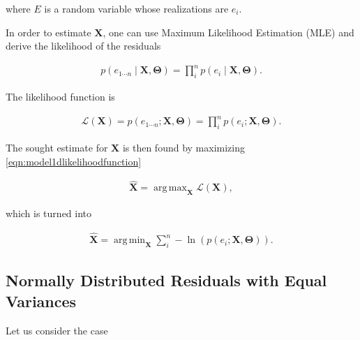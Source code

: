 \documentclass[12pt]{article}
\DeclareMathOperator*{\argmax}{arg\,max}
\DeclareMathOperator*{\argmin}{arg\,min}
\begin{document}
    \noindent where $E$ is a random variable whose realizations are $e_i$.

    In order to estimate $\mathbf{X}$, one can use Maximum Likelihood Estimation
    (MLE) and derive the likelihood of the residuals

    \begin{equation}\label{eqn:model1dlikelihood}
      \begin{aligned}
      p(e_{1\cdots n}\mid\mathbf{X},\boldsymbol{\Theta}) =
        \prod_i^n p(e_i\mid\mathbf{X},\boldsymbol{\Theta}).
      \end{aligned}
    \end{equation}

    The likelihood function is

    \begin{equation}\label{eqn:model1dlikelihoodfunction}
      \begin{aligned}
      \mathcal{L}(\mathbf{X}) = p(e_{1\cdots n};\mathbf{X},\boldsymbol{\Theta}) =
        \prod_i^n p(e_i;\mathbf{X},\boldsymbol{\Theta}).
      \end{aligned}
    \end{equation}


    The sought estimate for $\mathbf{X}$ is then found by maximizing
    \eqref{eqn:model1dlikelihoodfunction}

    \begin{equation}\label{eqn:model1dmaxl}
      \begin{aligned}
      \mathbf{\hat{X}} = \argmax_{\mathbf{X}}\mathcal{L}(\mathbf{X}),
      \end{aligned}
    \end{equation}

    which is turned into

    \begin{equation}\label{eqn:model1dminll}
      \begin{aligned}
      \mathbf{\hat{X}} =
      \argmin_{\mathbf{X}}\sum_i^n -\ln(p(e_i;\mathbf{X},\boldsymbol{\Theta})).
      \end{aligned}
    \end{equation}

    \subsection{Normally Distributed Residuals with Equal Variances}

      Let us consider the case
\end{document}
